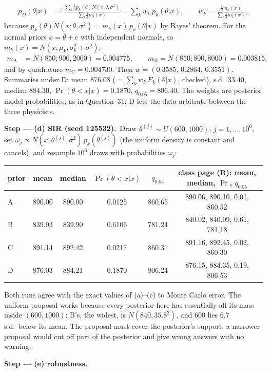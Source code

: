 \documentclass[11pt,a4paper]{article}
\newcommand{\passo}[2]{\par\smallskip\noindent\textbf{Step --- #1.}~#2}
\begin{document}
\begin{sol}
{\begin{align}
p_D(\theta|x)&=\frac{\sum_k\frac13p_k(\theta)N(x;\theta,\sigma^2)}{\sum_l\frac13m_l(x)}=\sum_kw_k\,p_k(\theta|x),\qquad w_k=\frac{\frac13m_k(x)}{\sum_l\frac13m_l(x)},\label{o5:mix}
\end{align}
because $p_k(\theta)N(x;\theta,\sigma^2)=m_k(x)\,p_k(\theta|x)$ by Bayes' theorem. For the normal priors $x=\theta+e$ with independent normals, so $m_k(x)=N(x;\mu_k,\sigma_k^2+\sigma^2)$:
\begin{align}
m_{\text{A}}&=N(850;900,2000)=0.004775,\qquad m_{\text{B}}=N(850;800,8000)=0.003815,\label{o5:mk}
\end{align}
and by quadrature $m_{\text{C}}=0.004730$. Then $w=(0.3585,\,0.2864,\,0.3551)$. Summaries under D: mean $876.08$ ($=\sum_kw_k\,E_k(\theta|x)$, checked), s.d.\ $33.40$, median $884.30$, $\Pr(\theta<x|x)=0.1870$, $q_{0.05}=806.40$. The weights are posterior model probabilities, as in Question~31: D lets the data arbitrate between the three physicists.}
\passo{(d) SIR (seed 125532)}{Draw $\theta^{(j)}\sim U(600,1000)$, $j=1,\ldots,10^6$, set $\omega_j\propto N(x;\theta^{(j)},\sigma^2)\,p_k(\theta^{(j)})$ (the uniform density is constant and cancels), and resample $10^6$ draws with probabilities $\omega_j$:
\begin{center}\small
\begin{tabular}{lcccc@{\qquad}c}
\toprule
prior & mean & median & $\Pr(\theta<x|x)$ & $q_{0.05}$ & class page (R): mean, median, $\Pr$, $q_{0.05}$\\
\midrule
A & 890.00 & 890.00 & 0.0125 & 860.65 & 890.06, 890.10, 0.01, 860.52\\
B & 839.93 & 839.90 & 0.6106 & 781.24 & 840.02, 840.09, 0.61, 781.18\\
C & 891.14 & 892.42 & 0.0217 & 860.31 & 891.16, 892.45, 0.02, 860.30\\
D & 876.03 & 884.21 & 0.1870 & 806.24 & 876.15, 884.35, 0.19, 806.53\\
\bottomrule
\end{tabular}
\end{center}
Both runs agree with the exact values of (a)--(c) to Monte Carlo error. The uniform proposal works because every posterior here has essentially all its mass inside $(600,1000)$: B's, the widest, is $N(840,35.8^2)$, and 600 lies $6.7$ s.d.\ below its mean. The proposal must cover the posterior's support; a narrower proposal would cut off part of the posterior and give wrong answers with no warning.}
\passo{(e) robustness}{\par
\begin{center}\small

\end{center}}
\end{sol}
\end{document}
